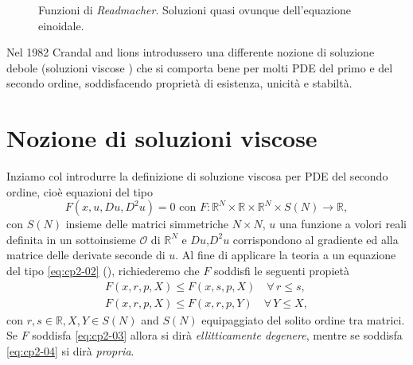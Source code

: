 \begin{figure}[!htb]
  \begin{center}
  \end{center}
  \caption{Funzioni di \emph{Readmacher}. Soluzioni quasi ovunque dell'equazione einoidale.}
  \label{fig:cp2-01}
\end{figure}

Nel 1982 Crandal and lions introdussero una differente nozione di soluzione debole (soluzioni viscose \cite[vedi][]{crand:lion}) che si comporta bene per molti PDE del primo e del secondo ordine, soddisfacendo proprietà di esistenza, unicità e stabiltà. 
%
%
%
\section{Nozione di soluzioni viscose}
Inziamo col introdurre la definizione di soluzione viscosa per PDE del secondo ordine, cioè equazioni del tipo
\begin{equation}
\label{eq:cp2-02}
F(x,u,Du,D^2u) = 0\text{ con }F:\mathbb{R}^N\times\mathbb{R}\times\mathbb{R}^N\times S(N)\to \mathbb{R},
\end{equation}
con $S(N)$ insieme delle matrici simmetriche $N\times N$, $u$ una funzione a volori reali definita in un sottoinsieme $\mathcal{O}$ di $\mathbb{R}^N$ e $Du$,$D^2u$ corrispondono al gradiente ed alla matrice delle derivate seconde di $u$. Al fine di applicare la teoria a un equazione del tipo \eqref{eq:cp2-02} (\cite[vedi][2]{crand:lion}), richiederemo che $F$ soddisfi le seguenti propietà
\begin{gather}
\label{eq:cp2-03}
F(x,r,p,X) \leq F(x,s,p,X) \quad \forall\,r\leq s,\\
\label{eq:cp2-04}
F(x,r,p,X) \leq F(x,r,p,Y) \quad \forall\,Y\leq X,
\end{gather}
con $r,s\in \mathbb{R},X,Y\in S(N)$ and $S(N)$ equipaggiato del solito ordine tra matrici. Se $F$ soddisfa \eqref{eq:cp2-03} allora si dirà \emph{ellitticamente degenere}, mentre se soddisfa \eqref{eq:cp2-04} si dirà \emph{propria}.
